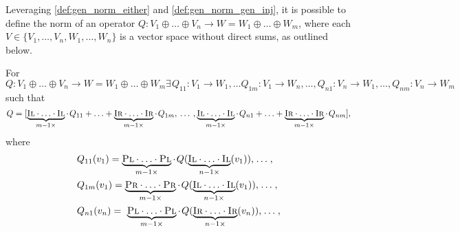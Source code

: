 Leveraging \autoref{def:gen_norm_either} and \autoref{def:gen_norm_gen_inj}, it is possible to define the norm of an operator $Q: V_1 \oplus \ldots \oplus V_n  \rightarrow W = W_1 \oplus \ldots \oplus W_m$, where each $V \in \{V_1, \ldots, V_n, W_1, \ldots, W_n\}$ is a vector space without direct sums, as outlined below.

\begin{definition} \label{def:gen_norm_ops}
  For $Q: V_1 \oplus \ldots \oplus V_n  \rightarrow W = W_1 \oplus \ldots \oplus W_m \exists \hspace{1pt} Q_{11}:V_1 \rightarrow W_1, \ldots Q_{1m}: V_1 \rightarrow W_n, \ldots,  Q_{n1}:V_n \rightarrow W_1, \ldots,  Q_{nm}:V_n \rightarrow W_m $ such that 
  $$Q= [ \underbrace{\textsc{Il} \cdot \ldots \cdot \textsc{Il}}_{m-1 \times} \cdot \hspace{1pt} Q_{11} + \ldots +   \underbrace{\textsc{Ir} \cdot \ldots \cdot \textsc{Ir}}_{m-1 \times}\cdot \hspace{1pt} Q_{1m},  \hspace{2pt} \ldots  \hspace{2pt},  \underbrace{\textsc{Il} \cdot \ldots \cdot \textsc{Il}}_{m-1 \times} \cdot\hspace{1pt} Q_{n1} + \ldots + \underbrace{\textsc{Ir} \cdot \ldots \cdot \textsc{Ir}}_{m-1 \times}\cdot \hspace{1pt} Q_{nm}],$$  
  where
  \begin{equation*}
    \begin{split}
      &Q_{11} (v_1) =\underbrace{\textsc{Pl} \cdot \ldots \cdot \textsc{Pl}}_{m-1 \times }  \cdot \hspace{1pt} Q  (\underbrace{\textsc{Il} \cdot \ldots \cdot \textsc{Il}}_{n-1 \times} (v_1)),  \hspace{1pt} \ldots \hspace{1pt} , \\
      &Q_{1m} (v_1) =\underbrace{\textsc{Pr} \cdot \ldots \cdot \textsc{Pr}}_{m-1 \times } \cdot \hspace{1pt} Q ( \underbrace{\textsc{Il} \cdot \ldots \cdot \textsc{Il}}_{n-1 \times} (v_1)), \hspace{1pt} \ldots \hspace{1pt},\\ 
      & Q_{n1} (v_n) = \ \underbrace{\textsc{Pl} \cdot \ldots \cdot \textsc{Pl}}_{m-1 \times } \cdot \hspace{1pt} Q (\underbrace{\textsc{Ir} \cdot \ldots \cdot \textsc{Ir}}_{n-1 \times}(v_n)), \hspace{1pt} \ldots \hspace{1pt},\\

\end{split}
\end{equation*}
\end{definition}
